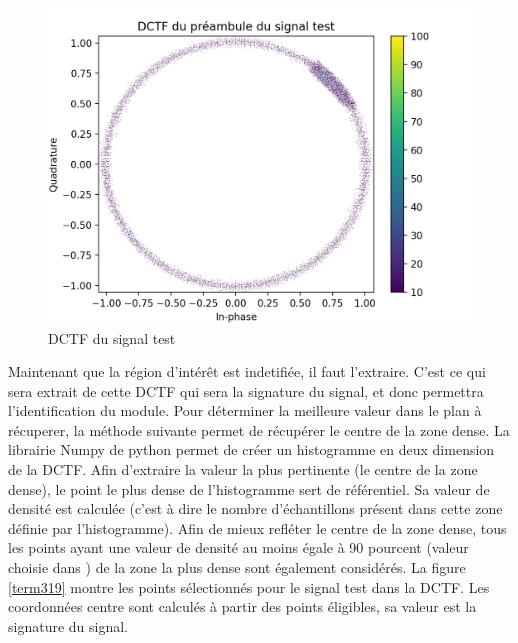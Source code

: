 \begin{figure}[h]
\centering

\includegraphics[scale=0.3]{images/dctf5.png}
\caption{DCTF du signal test}\label{term318}
\end{figure}

Maintenant que la région d'intérêt est indetifiée, il faut l'extraire. C'est ce qui sera extrait de cette DCTF qui sera la signature du signal, et donc permettra l'identification du module. Pour déterminer la meilleure valeur dans le plan à récuperer, la méthode suivante permet de récupérer le centre de la zone dense. La librairie Numpy de python permet de créer un histogramme en deux dimension de la DCTF. Afin d'extraire la valeur la plus pertinente (le centre de la zone dense), le point le plus dense de l'histogramme sert de référentiel. Sa valeur de densité est calculée (c'est à dire le nombre d'échantillons présent dans cette zone définie par l'histogramme). Afin de mieux refléter le centre de la zone dense, tous les points ayant une valeur de densité au moins égale à 90 pourcent (valeur choisie dans \cite{loraDCTF}) de la zone la plus dense sont également considérés. La figure \ref{term319} montre les points sélectionnés pour le signal test dans la DCTF. Les coordonnées centre sont calculés à partir des points éligibles, sa valeur est la signature du signal. 




